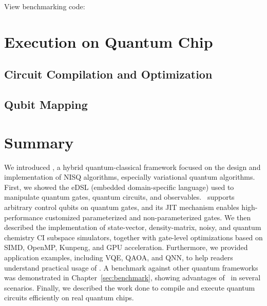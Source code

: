 \documentclass[pra,twocolumn,superscriptaddress,floatfix,nofootinbib,amsmath,amssymb]{revtex4-1}
\numberwithin{equation}{section}
\numberwithin{figure}{section}
\numberwithin{table}{section}
\begin{document}
View benchmarking code: \href{https://gitee.com/mindspore/mindquantum/blob/research/whitepaper/code/benchmark}{\color{ceruleanblue}{CPU}} \href{https://gitee.com/mindspore/mindquantum/blob/research/whitepaper/code/benchmark_gpu}{\color{ceruleanblue}{GPU}}




\section{Execution on Quantum Chip}
\label{sec:chip}
\subsection{Circuit Compilation and Optimization}


\subsection{Qubit Mapping}


% 

% 

\section{Summary}
\label{sec:summary}
We introduced \MindQuantum, a hybrid quantum-classical framework focused on the design and implementation of NISQ algorithms, especially variational quantum algorithms. First, we showed the eDSL (embedded domain-specific language) used to manipulate quantum gates, quantum circuits, and observables. \MindQuantum\ supports arbitrary control qubits on quantum gates, and its JIT mechanism enables high-performance customized parameterized and non-parameterized gates. We then described the implementation of state-vector, density-matrix, noisy, and quantum chemistry CI subspace simulators, together with gate-level optimizations based on SIMD, OpenMP, Kunpeng, and GPU acceleration. Furthermore, we provided application examples, including VQE, QAOA, and QNN, to help readers understand practical usage of \MindQuantum. A benchmark against other quantum frameworks was demonstrated in Chapter~\ref{sec:benchmark}, showing advantages of \MindQuantum\ in several scenarios. Finally, we described the work done to compile and execute quantum circuits efficiently on real quantum chips.
\end{document}
